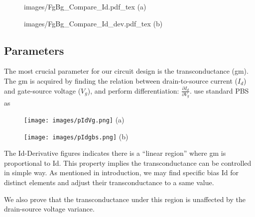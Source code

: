 \begin{figure}[!htbp]
    \centering
    \begin{minipage}[t][0.1\textheight]{1\textwidth}
        \centering
        \def\svgwidth{10cm}
        \fontsize{6}{15}\selectfont
         {images/FgBg_Compare_Id.pdf_tex}
        (a)
    \end{minipage}
    \vfill
    \begin{minipage}[t][0.1\textheight]{1\textwidth}
        \centering
        \def\svgwidth{10cm}
        \fontsize{6}{15}\selectfont
         {images/FgBg_Compare_Id_dev.pdf_tex}
        (b)
    \end{minipage}
    \caption{}
    \label{fig:IdVgandgbsId}
\end{figure}

\subsection{Parameters}
The most crucial parameter for our circuit design is the transconductance (gm).
{\color{red}
    The gm is acquired by finding the relation between drain-to-source current ($I_d$) and gate-source voltage ($V_g$), and perform differentiation: $\frac{\partial I_d}{\partial V_g}$.
    use standard PBS as
}

\begin{figure}[!htbp]
    \centering
    \begin{minipage}[t][0.1\textheight]{1\textwidth}
        \centering
        \texttt{[image: images/pIdVg.png]}
        (a)
    \end{minipage}
    \hfill
    \begin{minipage}[t][0.1\textheight]{1\textwidth}
        \centering
        \texttt{[image: images/pIdgbs.png]}
        (b)
    \end{minipage}
    \caption{}
    \label{fig:pIdVg}
\end{figure}

The Id-Derivative figures indicates there is a ``linear region'' where gm is proportional to Id.
This property implies the transconductance can be controlled in simple way.
As mentioned in introduction, we may find specific bias Id for distinct elements and adjust their transconductance to a same value.



We also prove that the transconductance under this region is unaffected by the drain-source voltage variance.

